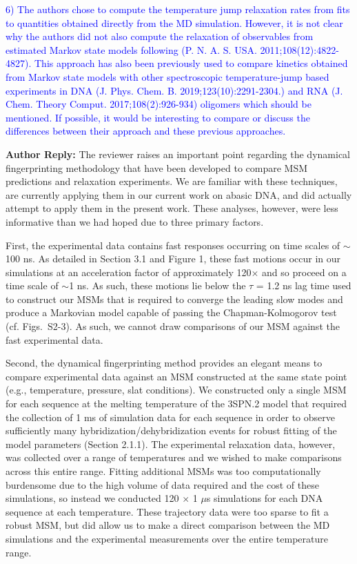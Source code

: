 \documentclass[11pt,a4paper]{letter} %
\begin{document}
\clearpage
\newpage




\textcolor{blue}{6)       The authors chose to compute the temperature jump relaxation rates from fits to quantities obtained directly from the MD simulation. However, it is not clear why the authors did not also compute the relaxation of observables from estimated Markov state models following (P. N. A. S. USA. 2011;108(12):4822-4827). This approach has also been previously used to compare kinetics obtained from Markov state models with other spectroscopic temperature-jump based experiments in DNA (J. Phys. Chem. B. 2019;123(10):2291-2304.) and RNA (J. Chem. Theory Comput. 2017;108(2):926-934) oligomers which should be mentioned. If possible, it would be interesting to compare or discuss the differences between their approach and these previous approaches.}


\textbf{Author Reply:}   The reviewer raises an important point regarding the dynamical fingerprinting methodology that have been developed to compare MSM predictions and relaxation experiments. We are familiar with these techniques, are currently applying them in our current work on abasic DNA, and did actually attempt to apply them in the present work. These analyses, however, were less informative than we had hoped due to three primary factors. 

First, the experimental data contains fast responses occurring on time scales of $\sim$100 ns. As detailed in Section 3.1 and Figure 1, these fast motions occur in our simulations at an acceleration factor of approximately 120$\times$ and so proceed on a time scale of $\sim$1 ns. As such, these motions lie below the $\tau$ = 1.2 ns lag time used to construct our MSMs that is required to converge the leading slow modes and produce a Markovian model capable of passing the Chapman-Kolmogorov test (cf. Figs.~S2-3). As such, we cannot draw comparisons of our MSM against the fast experimental data. 

Second, the dynamical fingerprinting method provides an elegant means to compare experimental data against an MSM constructed at the same state point (e.g., temperature, pressure, slat conditions). We constructed only a single MSM for each sequence at the melting temperature of the 3SPN.2 model that required the collection of 1 ms of simulation data for each sequence in order to observe sufficiently many hybridization/dehybridization events for robust fitting of the model parameters (Section 2.1.1). The experimental relaxation data, however, was collected over a range of temperatures and we wished to make comparisons across this entire range. Fitting additional MSMs was too computationally burdensome due to the high volume of data required and the cost of these simulations, so instead we conducted 120 $\times$ 1 $\mu$s simulations for each DNA sequence at each temperature. These trajectory data were too sparse to fit a robust MSM, but did allow us to make a direct comparison between the MD simulations and the experimental measurements over the entire temperature range. 
\end{document}

